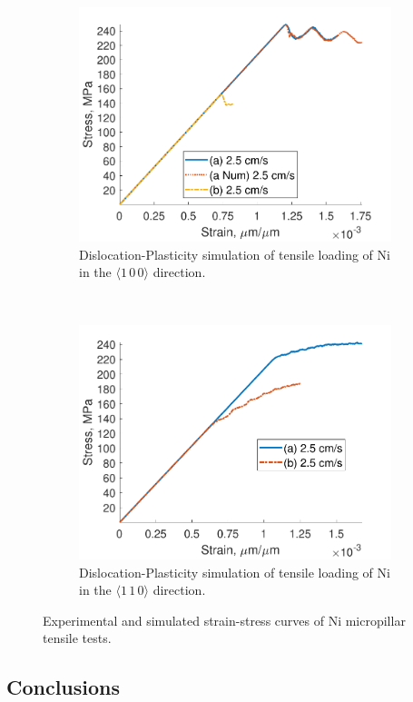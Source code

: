 \begin{figure}
    \begin{subfigure}[t]{0.45\linewidth}
        \centering
        \includegraphics[width=\linewidth]{../data/Ni100_DDD.pdf}
        \caption[Dislocation-Plasticity simulation of tensile loading of Ni in the $\langle 1\, 0\, 0 \rangle$ direction.]{Dislocation-Plasticity simulation of tensile loading of Ni in the $\langle 1\, 0\, 0 \rangle$ direction.}
        \label{sf:Ni100_DDD}
    \end{subfigure}
    ~
    \begin{subfigure}[t]{0.45\linewidth}
        \centering
        \includegraphics[width=\linewidth]{../data/Ni110_DDD.pdf}
        \caption[Dislocation-Plasticity simulation of tensile loading of Ni in the $\langle 1\, 1\, 0 \rangle$ direction.]{Dislocation-Plasticity simulation of tensile loading of Ni  in the $\langle 1\, 1\, 0 \rangle$ direction.}
        \label{sf:Ni110_DDD}
    \end{subfigure}
    \caption{Experimental and simulated strain-stress curves of Ni micropillar tensile tests.}
    \label{f:NiStrainStress}
\end{figure}

\subsection{Conclusions}





